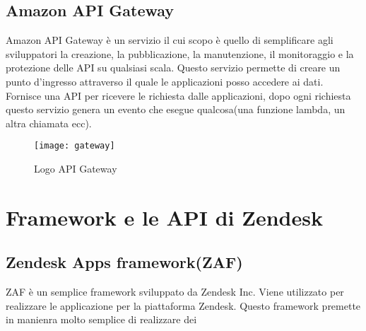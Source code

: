 \subsection{Amazon API Gateway} Amazon API Gateway è un servizio il cui scopo è quello di semplificare agli sviluppatori
la creazione, la pubblicazione, la manutenzione, il monitoraggio e la protezione
delle API su qualsiasi scala.
Questo servizio permette di creare un punto d'ingresso attraverso il quale le applicazioni posso accedere ai dati. Fornisce una API per ricevere le richiesta dalle applicazioni, dopo ogni richiesta questo servizio genera un evento che esegue qualcosa(una funzione lambda, un altra chiamata ecc).
\begin{figure}[!h] 
	\centering 
	\texttt{[image: gateway]}
	\caption{Logo API Gateway}
\end{figure} 
\section{Framework e le API di Zendesk}

\subsection{Zendesk Apps framework(ZAF)}
ZAF è un semplice framework sviluppato da Zendesk Inc. Viene utilizzato per realizzare le applicazione per la piattaforma Zendesk. Questo framework premette in manienra molto semplice di realizzare dei


